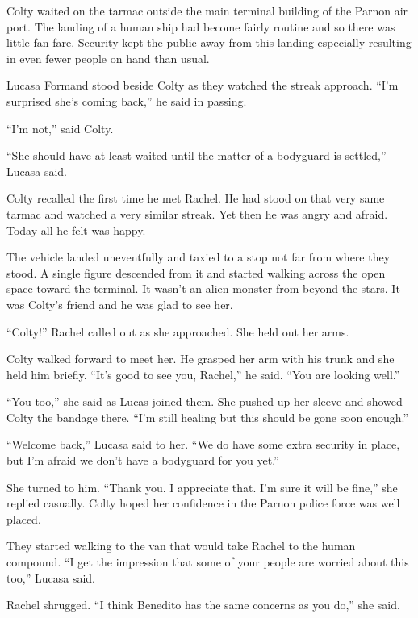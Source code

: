 
Colty waited on the tarmac outside the main terminal building of the Parnon air port. The
landing of a human ship had become fairly routine and so there was little fan fare. Security
kept the public away from this landing especially resulting in even fewer people on hand than
usual.

Lucasa Formand stood beside Colty as they watched the streak approach. ``I'm surprised she's
coming back,'' he said in passing.

``I'm not,'' said Colty.

``She should have at least waited until the matter of a bodyguard is settled,'' Lucasa said.

Colty recalled the first time he met Rachel. He had stood on that very same tarmac and watched
a very similar streak. Yet then he was angry and afraid. Today all he felt was happy.

The vehicle landed uneventfully and taxied to a stop not far from where they stood. A single
figure descended from it and started walking across the open space toward the terminal. It
wasn't an alien monster from beyond the stars. It was Colty's friend and he was glad to see her.

``Colty!'' Rachel called out as she approached. She held out her arms.

Colty walked forward to meet her. He grasped her arm with his trunk and she held him briefly.
``It's good to see you, Rachel,'' he said. ``You are looking well.''

``You too,'' she said as Lucas joined them. She pushed up her sleeve and showed Colty the
bandage there. ``I'm still healing but this should be gone soon enough.''

``Welcome back,'' Lucasa said to her. ``We do have some extra security in place, but I'm afraid
we don't have a bodyguard for you yet.''

She turned to him. ``Thank you. I appreciate that. I'm sure it will be fine,'' she replied
casually. Colty hoped her confidence in the Parnon police force was well placed.

They started walking to the van that would take Rachel to the human compound. ``I get the
impression that some of your people are worried about this too,'' Lucasa said.

Rachel shrugged. ``I think Benedito has the same concerns as you do,'' she said.
